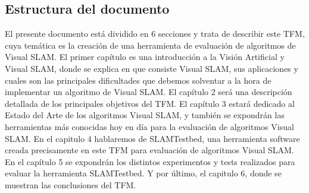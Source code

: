 \begin {enumerate}
\section{Estructura del documento}
El presente documento está dividido en 6 secciones y trata de describir este TFM, cuya temática  es la creación de una herramienta de evaluación de algoritmos de Visual SLAM. 
El primer capítulo es una introducción a la Visión Artificial y Visual SLAM, donde se explica en que consiste Visual SLAM, sus aplicaciones y cuales son las principales dificultades que debemos solventar a la hora de implementar un algoritmo de Visual SLAM. 
El capítulo 2 será una descripción detallada de los principales objetivos del TFM.
El capítulo 3 estará dedicado al Estado del Arte de los algoritmos Visual SLAM, y también se expondrán las herramientas más conocidas hoy en día para la evaluación de algoritmos Visual SLAM. 
En el capitulo 4 hablaremos de SLAMTestbed, una herramienta software creada precisamente en este TFM para evaluación de algoritmos Visual SLAM.
En el capítulo 5 se expondrán los distintos experimentos y tests realizados para evaluar la herramienta SLAMTestbed.
Y por último, el capitulo 6, donde se muestran las conclusiones del TFM.


\end {enumerate}
\flushbottom
\clearpage
\newpage
\pagebreak





